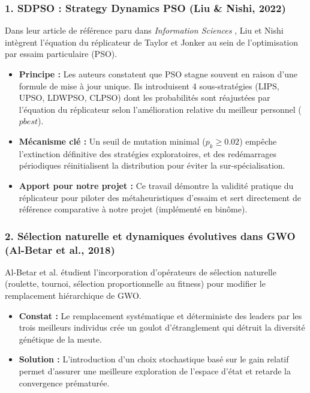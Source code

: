 \subsubsection{1. SDPSO : Strategy Dynamics PSO (Liu \& Nishi, 2022)}
Dans leur article de référence paru dans \textit{Information Sciences} \cite{liu2022strategy}, Liu et Nishi intègrent l'équation du réplicateur de Taylor et Jonker au sein de l'optimisation par essaim particulaire (PSO).
\begin{itemize}
    \item \textbf{Principe :} Les auteurs constatent que PSO stagne souvent en raison d'une formule de mise à jour unique. Ils introduisent 4 sous-stratégies (LIPS, UPSO, LDWPSO, CLPSO) dont les probabilités sont réajustées par l'équation du réplicateur selon l'amélioration relative du meilleur personnel ($pbest$).
    \item \textbf{Mécanisme clé :} Un seuil de mutation minimal ($p_k \ge 0.02$) empêche l'extinction définitive des stratégies exploratoires, et des redémarrages périodiques réinitialisent la distribution pour éviter la sur-spécialisation.
    \item \textbf{Apport pour notre projet :} Ce travail démontre la validité pratique du réplicateur pour piloter des métaheuristiques d'essaim et sert directement de référence comparative à notre projet (implémenté en binôme).
\end{itemize}

\subsubsection{2. Sélection naturelle et dynamiques évolutives dans GWO (Al-Betar et al., 2018)}
Al-Betar et al. \cite{albetar2018natural} étudient l'incorporation d'opérateurs de sélection naturelle (roulette, tournoi, sélection proportionnelle au fitness) pour modifier le remplacement hiérarchique de GWO.
\begin{itemize}
    \item \textbf{Constat :} Le remplacement systématique et déterministe des leaders par les trois meilleurs individus crée un goulot d'étranglement qui détruit la diversité génétique de la meute.
    \item \textbf{Solution :} L'introduction d'un choix stochastique basé sur le gain relatif permet d'assurer une meilleure exploration de l'espace d'état et retarde la convergence prématurée.
\end{itemize}

